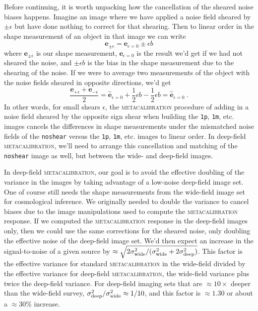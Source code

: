 \documentclass[twocolumn]{openjournal}
\makeatletter
\newcommand{\mcal}{\textsc{metacalibration}\@\xspace}
\newcommand{\noshear}{\texttt{noshear}\@\xspace}
\makeatother
\begin{document}
Before continuing, it is worth unpacking how the cancellation of the sheared noise
biases happens.  Imagine an image where we have applied a noise field sheared by
$\pm\epsilon$ but have done nothing to correct for that shearing. Then to linear order
in the shape measurement of an object in that image we can write
\begin{equation*}
\mathbf{e}_{\pm\epsilon} = \mathbf{e}_{\epsilon=0} \pm \epsilon b
\end{equation*}
where $\mathbf{e}_{\pm\epsilon}$ is our shape measurement,
$\mathbf{e}_{\epsilon=0}$ is the result we'd get if we had not sheared the noise, and
$\pm \epsilon b$ is the bias in the shape measurement due to the shearing of the noise.
If we were to average two measurements of the object with the noise fields sheared in
opposite directions, we'd get
\begin{equation*}
\frac{\mathbf{e}_{+\epsilon} + \mathbf{e}_{-\epsilon}}{2}
= \hat{\mathbf{e}}_{\epsilon=0} + \frac{1}{2}\epsilon b - \frac{1}{2}\epsilon b
= \hat{\mathbf{e}}_{\epsilon=0}\ .
\end{equation*}
In other words, for small shears $\epsilon$, the \mcal procedure of adding in a noise
field sheared by the opposite sign shear when building the \texttt{1p}, \texttt{1m}, etc.
images cancels the differences in shape measurements under the mismatched noise fields
of the \noshear versus the \texttt{1p}, \texttt{1m}, etc. images to linear order. In
deep-field \mcal, we'll need to arrange this cancellation and matching of the \noshear
image as well, but between the wide- and deep-field images.

In deep-field \mcal, our goal is to avoid the effective doubling of the variance in the
images by taking advantage of a low-noise deep-field image set. One of course still
needs the shape measurements from the wide-field image set for cosmological inference.
We originally needed to double the variance to cancel biases due to the image
manipulations used to compute the \mcal response. If we computed the \mcal response in
the deep-field images only, then we could use the same corrections for the sheared
noise, only doubling the effective noise of the deep-field image set. We'd then expect
an increase in the signal-to-noise of a given source by
$\approx\sqrt{2\sigma^2_{\rm wide}/(\sigma^2_{\rm wide} + 2\sigma^2_{\rm deep})}$.
This factor is the effective variance for standard \mcal in the wide-field divided by
the effective variance for deep-field \mcal, the wide-field variance plus twice the
deep-field variance. For deep-field imaging sets that are $\approx10\times$ deeper than
the wide-field survey, $\sigma^{2}_{\rm deep}/\sigma^{2}_{\rm wide}\approx 1/10$, and
this factor is $\approx1.30$ or about a $\approx30\%$ increase.
\end{document}
